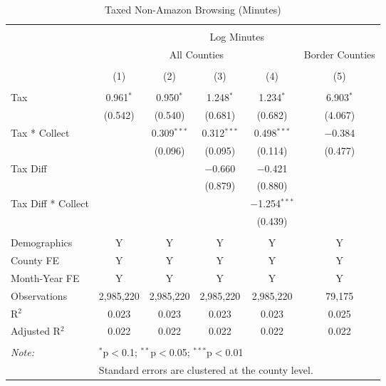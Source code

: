 
\begin{table}[!htbp] \centering 
  \caption{Taxed Non-Amazon Browsing (Minutes)} 
  \label{} 
\begin{tabular}{@{\extracolsep{5pt}}lccccc} 
\\[-1.8ex]\hline 
\hline \\[-1.8ex] 
 & \multicolumn{5}{c}{Log Minutes} \\ 
\cline{2-6} 
 & \multicolumn{4}{c}{All Counties} & Border Counties \\ 
\\[-1.8ex] & (1) & (2) & (3) & (4) & (5)\\ 
\hline \\[-1.8ex] 
 Tax & 0.961$^{*}$ & 0.950$^{*}$ & 1.248$^{*}$ & 1.234$^{*}$ & 6.903$^{*}$ \\ 
  & (0.542) & (0.540) & (0.681) & (0.682) & (4.067) \\ 
  Tax * Collect &  & 0.309$^{***}$ & 0.312$^{***}$ & 0.498$^{***}$ & $-$0.384 \\ 
  &  & (0.096) & (0.095) & (0.114) & (0.477) \\ 
  Tax Diff &  &  & $-$0.660 & $-$0.421 &  \\ 
  &  &  & (0.879) & (0.880) &  \\ 
  Tax Diff * Collect &  &  &  & $-$1.254$^{***}$ &  \\ 
  &  &  &  & (0.439) &  \\ 
 \hline \\[-1.8ex] 
Demographics & Y & Y & Y & Y & Y \\ 
County FE & Y & Y & Y & Y & Y \\ 
Month-Year FE & Y & Y & Y & Y & Y \\ 
Observations & 2,985,220 & 2,985,220 & 2,985,220 & 2,985,220 & 79,175 \\ 
R$^{2}$ & 0.023 & 0.023 & 0.023 & 0.023 & 0.025 \\ 
Adjusted R$^{2}$ & 0.022 & 0.022 & 0.022 & 0.022 & 0.022 \\ 
\hline 
\hline \\[-1.8ex] 
\textit{Note:}  & \multicolumn{5}{l}{$^{*}$p$<$0.1; $^{**}$p$<$0.05; $^{***}$p$<$0.01} \\ 
 & \multicolumn{5}{l}{Standard errors are clustered at the county level.} \\ 
\end{tabular} 
\end{table} 
